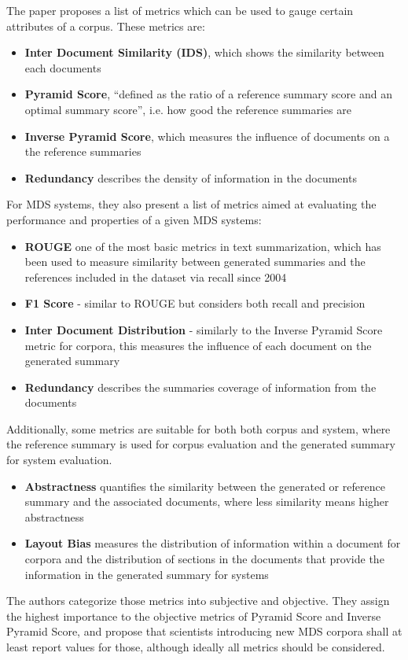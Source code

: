 \documentclass[20_original-paper.tex]{subfiles}
\begin{document}
The paper proposes a list of metrics which can be used to gauge certain attributes of a corpus. These metrics are:

\begin{itemize}
    \item \textbf{Inter Document Similarity (IDS)}, which shows the similarity between each documents
    \item \textbf{Pyramid Score}, \enquote{defined as the ratio of a reference summary score and an optimal summary score}\cite{dey-etal-2020-corpora},
          i.e. how good the reference summaries are
    \item \textbf{Inverse Pyramid Score}, which measures the influence of documents on a the reference summaries
    \item \textbf{Redundancy} describes the density of information in the documents
\end{itemize}

For MDS systems, they also present a list of metrics aimed at evaluating the performance and properties of a given MDS systems:

\begin{itemize}
    \item \textbf{ROUGE} one of the most basic metrics in text summarization,
          which has been used to measure similarity between generated summaries and the references included in the dataset via recall since 2004\cite{lin-2004-rouge}
    \item \textbf{F1 Score} - similar to ROUGE but considers both recall and precision
    \item \textbf{Inter Document Distribution} - similarly to the Inverse Pyramid Score metric for corpora, this measures the influence of each document on the generated summary
    \item \textbf{Redundancy} describes the summaries coverage of information from the documents

\end{itemize}

Additionally, some metrics are suitable for both both corpus and system, where the reference summary is used for corpus evaluation and the generated summary for system evaluation.

\begin{itemize}
    \item \textbf{Abstractness} quantifies the similarity between the generated or reference summary and the associated documents, where less similarity means higher abstractness
    \item \textbf{Layout Bias} measures the distribution of information within a document for corpora and the distribution of sections in the documents that provide the information in the generated summary for systems
\end{itemize}

The authors categorize those metrics into subjective and objective.
They assign the highest importance to the objective metrics of Pyramid Score and Inverse Pyramid Score,
and propose that scientists introducing new MDS corpora shall at least report values for those, although ideally all metrics should be considered.
\end{document}
